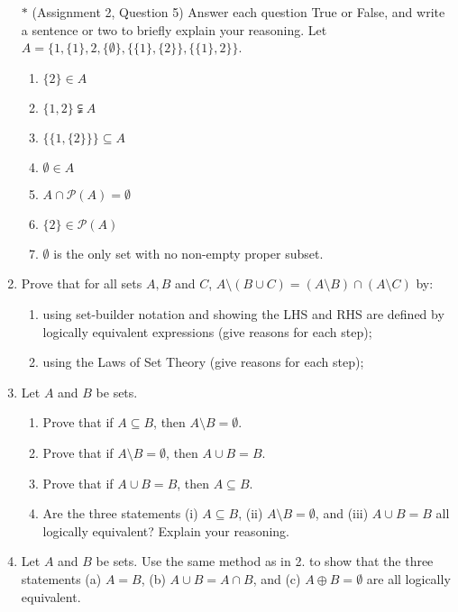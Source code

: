 \documentclass[11 pt]{article}%
\begin{document}
\begin{enumerate}

\item[$\ast$]  (Assignment 2, Question 5)  Answer each question True or False, and write a sentence or two to briefly explain your reasoning.
Let $A = \{1, \{1\}, 2,   \{\emptyset\}, \{ \{1\}, \{2\}\}, \{\{1\},2\}\}$.  

\begin{enumerate}
\item $\{2\} \in A$
\item $\{1,2\} \subsetneqq A$ 
\item $\{\{1, \{2\}\}\} \subseteq A$
\item $\emptyset \in A$
\item $A \cap \mathcal{P}(A) = \emptyset$
\item $\{2\} \in \mathcal{P}(A)$
\item $\emptyset$ is the only set with no non-empty proper subset.
\end{enumerate}

\item Prove that for all sets $A, B$ and $C$, 
$A \setminus (B \cup C) = (A \setminus B) \cap (A \setminus C)$ by:
\begin{enumerate}
\item using set-builder notation and showing the LHS and RHS are defined by logically equivalent expressions (give reasons for each step);
\item using the Laws of Set Theory  (give reasons for each step);
\end{enumerate}

\item Let $A$ and $B$ be sets.
\begin{enumerate}
\item Prove that if $A \subseteq B$, then $A \setminus B = \emptyset$.
\item Prove that if $A \setminus B = \emptyset$, then $A \cup B = B$.
\item Prove that if $A \cup B = B$, then $A \subseteq B$.
\item Are the three statements (i) $A \subseteq B$, (ii) $A \setminus B = \emptyset$, and (iii) $A \cup B = B$
all logically equivalent?  Explain your reasoning.
\end{enumerate}


\item Let $A$ and $B$ be sets.  Use the same method as in 2. to show that the three statements 
(a) $A = B$,
(b) $A \cup B = A \cap B$, and 
(c) $A \oplus B = \emptyset$
are all logically equivalent.


\end{enumerate}
\end{document}
